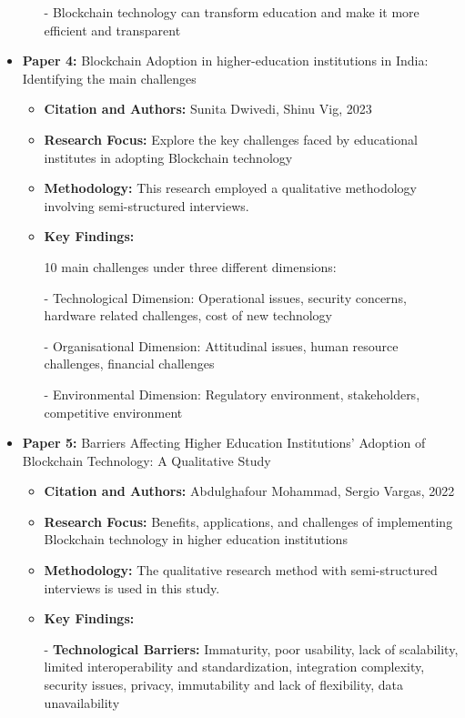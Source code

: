 \documentclass[12pt,a4paper]{article}
\begin{document}
\begin{itemize}
\begin{itemize}
        - Blockchain technology can transform education and make it more efficient and transparent
    \end{itemize}
    \vspace{0.2cm}
    \item \textbf{Paper 4:} Blockchain Adoption in higher-education institutions in India: Identifying the main challenges
    \begin{itemize}
        \item \textbf{Citation and Authors:} Sunita Dwivedi, Shinu Vig, 2023 \cite{p4}
        \item \textbf{Research Focus:} Explore the key challenges faced by educational institutes in adopting Blockchain technology
        \item \textbf{Methodology:} This research employed a qualitative methodology involving semi-structured interviews.
        \item \textbf{Key Findings:} 
        
        10 main challenges under three different dimensions:

        - Technological Dimension: Operational issues, security concerns, hardware related challenges, cost of new technology

        - Organisational Dimension: Attitudinal issues, human resource challenges, financial challenges

        - Environmental Dimension: Regulatory environment, stakeholders, competitive environment
    \end{itemize}
    \vspace{0.2cm}
    \item \textbf{Paper 5:} Barriers Affecting Higher Education Institutions' Adoption of Blockchain Technology: A Qualitative Study
    \begin{itemize}
        \item \textbf{Citation and Authors:} Abdulghafour Mohammad, Sergio Vargas, 2022 \cite{p5}
        \item \textbf{Research Focus:} Benefits, applications, and challenges of implementing Blockchain technology in higher education institutions
        \item \textbf{Methodology:} The qualitative research method with semi-structured interviews is used in this study.
        \item \textbf{Key Findings:} 

        - \textbf{Technological Barriers:} Immaturity, poor usability, lack of scalability, limited interoperability and standardization, integration complexity, security issues, privacy, immutability and lack of flexibility, data unavailability


\end{itemize}
\end{itemize}
\end{document}
